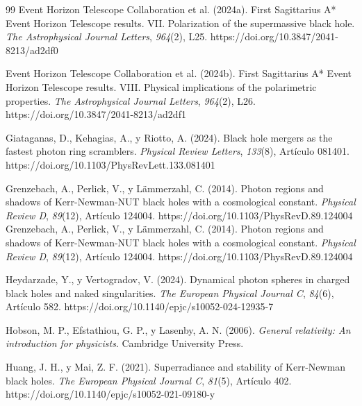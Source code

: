 \documentclass[twoside,onehalfspace]{./Portada/unmsmtesis}
\begin{document}
\begin{thebibliography}{99}
 Event Horizon Telescope Collaboration et al. (2024a). First Sagittarius A* Event Horizon Telescope results. VII. Polarization of the supermassive black hole. \textit{The Astrophysical Journal Letters}, \textit{964}(2), L25. https://doi.org/10.3847/2041-8213/ad2df0

 Event Horizon Telescope Collaboration et al. (2024b). First Sagittarius A* Event Horizon Telescope results. VIII. Physical implications of the polarimetric properties. \textit{The Astrophysical Journal Letters}, \textit{964}(2), L26. https://doi.org/10.3847/2041-8213/ad2df1

 Giataganas, D., Kehagias, A., y Riotto, A. (2024). Black hole mergers as the fastest photon ring scramblers. \textit{Physical Review Letters}, \textit{133}(8), Artículo 081401. https://doi.org/10.1103/PhysRevLett.133.081401

 Grenzebach, A., Perlick, V., y Lämmerzahl, C. (2014). Photon regions and shadows of Kerr-Newman-NUT black holes with a cosmological constant. \textit{Physical Review D}, \textit{89}(12), Artículo 124004. https://doi.org/10.1103/PhysRevD.89.124004
 Grenzebach, A., Perlick, V., y Lämmerzahl, C. (2014). Photon regions and shadows of Kerr-Newman-NUT black holes with a cosmological constant. \textit{Physical Review D}, \textit{89}(12), Artículo 124004. https://doi.org/10.1103/PhysRevD.89.124004

 Heydarzade, Y., y Vertogradov, V. (2024). Dynamical photon spheres in charged black holes and naked singularities. \textit{The European Physical Journal C}, \textit{84}(6), Artículo 582. https://doi.org/10.1140/epjc/s10052-024-12935-7

 Hobson, M. P., Efstathiou, G. P., y Lasenby, A. N. (2006). \textit{General relativity: An introduction for physicists}. Cambridge University Press.

 Huang, J. H., y Mai, Z. F. (2021). Superradiance and stability of Kerr-Newman black holes. \textit{The European Physical Journal C}, \textit{81}(5), Artículo 402. https://doi.org/10.1140/epjc/s10052-021-09180-y


\end{thebibliography}
\end{document}
